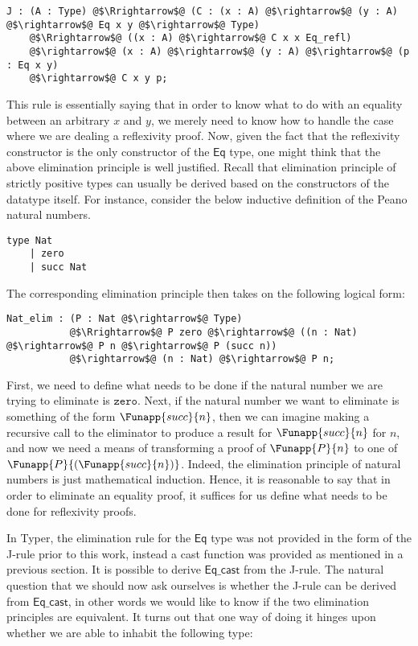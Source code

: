 \documentclass[12pt,twoside,maitrise]{dms}
\theoremstyle{definition}
\numberwithin{equation}{section}
\numberwithin{table}{chapter}
\numberwithin{figure}{chapter}
\newcommand\kw[1] {\textsf{#1}}
\newcommand\id[1] {\texttt{#1}}
\begin{document}
\begin{verbatim}
J : (A : Type) @$\Rrightarrow$@ (C : (x : A) @$\rightarrow$@ (y : A) @$\rightarrow$@ Eq x y @$\rightarrow$@ Type)
    @$\Rrightarrow$@ ((x : A) @$\rightarrow$@ C x x Eq_refl)
    @$\rightarrow$@ (x : A) @$\rightarrow$@ (y : A) @$\rightarrow$@ (p : Eq x y)
    @$\rightarrow$@ C x y p;
\end{verbatim}

This rule is essentially saying that in order to know what to do with an
equality between an arbitrary $x$ and $y$, we merely need to know how to handle
the case where we are dealing a reflexivity proof. Now, given the fact that the
reflexivity constructor is the only constructor of the $\kw{Eq}$ type, one might
think that the above elimination principle is well justified. Recall that
elimination principle of strictly positive types\cite{abbott2005containers} can
usually be derived based on the constructors of the datatype itself. For
instance, consider the below inductive definition of the Peano natural numbers.

\begin{verbatim}
type Nat
    | zero
    | succ Nat
\end{verbatim}

The corresponding elimination principle then takes on the following logical form:

\begin{verbatim}
Nat_elim : (P : Nat @$\rightarrow$@ Type)
           @$\Rrightarrow$@ P zero @$\rightarrow$@ ((n : Nat) @$\rightarrow$@ P n @$\rightarrow$@ P (succ n))
           @$\rightarrow$@ (n : Nat) @$\rightarrow$@ P n;
\end{verbatim}

First, we need to define what needs to be done if the natural number we are
trying to eliminate is $\id{zero}$. Next, if the natural number we want to
eliminate is something of the form $\Funapp{succ}{n}$, then we can imagine
making a recursive call to the eliminator to produce a result for
$\Funapp{succ}{n}$ for $n$, and now we need a means of transforming a proof of
$\Funapp{P}{n}$ to one of $\Funapp{P}{(\Funapp{succ}{n})}$. Indeed, the
elimination principle of natural numbers is just mathematical induction. Hence,
it is reasonable to say that in order to eliminate an equality proof, it
suffices for us define what needs to be done for reflexivity proofs.

In Typer, the elimination rule for the $\kw{Eq}$ type was not provided in the
form of the J-rule prior to this work, instead a cast function was provided as
mentioned in a previous section. It is possible to derive $\kw{Eq\_cast}$ from
the J-rule. The natural question that we should now ask ourselves is whether the
J-rule can be derived from $\kw{Eq\_cast}$, in other words we would like to know
if the two elimination principles are equivalent. It turns out that one way of
doing it hinges upon whether we are able to inhabit the following type:
\end{document}

